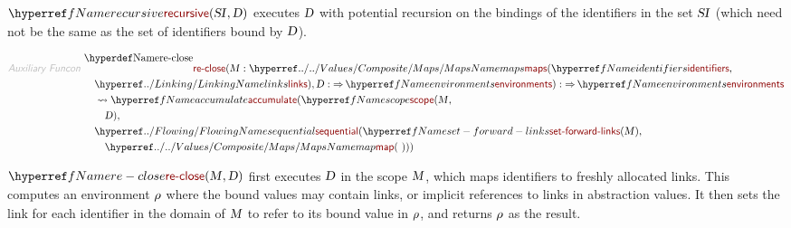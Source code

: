 $\SHADE{\NAMEREF{recursive}
           (\VAR{SI},   
            \VAR{D})}$ executes $\SHADE{\VAR{D}}$ with potential recursion on the bindings of 
  the identifiers in the set $\SHADE{\VAR{SI}}$ (which need not be the same as the set of
  identifiers bound by $\SHADE{\VAR{D}}$).

\begin{displaymath}
\relax\begin{aligned}\relax
  \KEY{Auxiliary Funcon} ~ 
  & \NAMEDECL{re-close}(\VAR{M} : \NAMEHYPER{../../Values/Composite}{Maps}{maps}
                                (\NAMEREF{identifiers}, \\&\quad 
                                 \NAMEHYPER{..}{Linking}{links}), \VAR{D} :  \TO \NAMEREF{environments}) :  \TO \NAMEREF{environments} \\
  & \quad \leadsto \NAMEREF{accumulate}
                     (\NAMEREF{scope}
                        (\VAR{M}, \\&\quad \quad 
                         \VAR{D}), \\&\quad 
                      \NAMEHYPER{..}{Flowing}{sequential}
                        (\NAMEREF{set-forward-links}
                           (\VAR{M}), \\&\quad \quad 
                         \NAMEHYPER{../../Values/Composite}{Maps}{map}
                           ( ~ )))
\end{aligned}
\end{displaymath}

$\SHADE{\NAMEREF{re-close}
           (\VAR{M},   
            \VAR{D})}$ first executes $\SHADE{\VAR{D}}$ in the scope $\SHADE{\VAR{M}}$, which maps identifiers
  to freshly allocated links. This computes an environment $\SHADE{\VAR{$\rho$}}$ where the bound
  values may contain links, or implicit references to links in abstraction
  values. It then sets the link for each identifier in the domain of $\SHADE{\VAR{M}}$ to
  refer to its bound value in $\SHADE{\VAR{$\rho$}}$, and returns $\SHADE{\VAR{$\rho$}}$ as the result.

